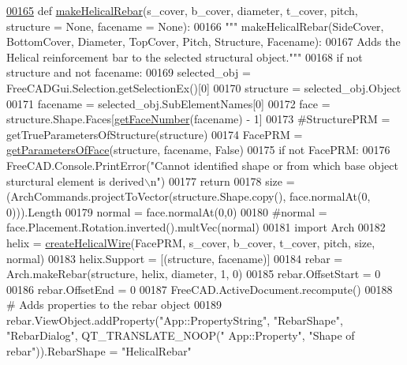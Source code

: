 \begin{DoxyCode}
\hypertarget{namespaceHelicalRebar.tex_l00165}{}\hyperlink{namespaceHelicalRebar_a8a4f12ed70819996ac31877957dfab08}{00165} \textcolor{keyword}{def }\hyperlink{namespaceHelicalRebar_a8a4f12ed70819996ac31877957dfab08}{makeHelicalRebar}(s\_cover, b\_cover, diameter, t\_cover, pitch, structure = None, facename
       = None):
00166     \textcolor{stringliteral}{""" makeHelicalRebar(SideCover, BottomCover, Diameter, TopCover, Pitch, Structure, Facename):}
00167 \textcolor{stringliteral}{    Adds the Helical reinforcement bar to the selected structural object."""}
00168     \textcolor{keywordflow}{if} \textcolor{keywordflow}{not} structure \textcolor{keywordflow}{and} \textcolor{keywordflow}{not} facename:
00169         selected\_obj = FreeCADGui.Selection.getSelectionEx()[0]
00170         structure = selected\_obj.Object
00171         facename = selected\_obj.SubElementNames[0]
00172     face = structure.Shape.Faces[\hyperlink{namespaceRebarfunc_a3885b3b63e3a41508ac79bc7550cf301}{getFaceNumber}(facename) - 1]
00173     \textcolor{comment}{#StructurePRM = getTrueParametersOfStructure(structure)}
00174     FacePRM = \hyperlink{namespaceRebarfunc_a92122b3d7cedd3d47bb63380a5ac4d08}{getParametersOfFace}(structure, facename, \textcolor{keyword}{False})
00175     \textcolor{keywordflow}{if} \textcolor{keywordflow}{not} FacePRM:
00176         FreeCAD.Console.PrintError(\textcolor{stringliteral}{"Cannot identified shape or from which base object sturctural element is
       derived\(\backslash\)n"})
00177         \textcolor{keywordflow}{return}
00178     size = (ArchCommands.projectToVector(structure.Shape.copy(), face.normalAt(0, 0))).Length
00179     normal = face.normalAt(0,0)
00180     \textcolor{comment}{#normal = face.Placement.Rotation.inverted().multVec(normal)}
00181     \textcolor{keyword}{import} Arch
00182     helix = \hyperlink{namespaceHelicalRebar_a1a2b3ce39b904ab0c3892ed0965d2844}{createHelicalWire}(FacePRM, s\_cover, b\_cover, t\_cover, pitch, size, normal)
00183     helix.Support = [(structure, facename)]
00184     rebar = Arch.makeRebar(structure, helix, diameter, 1, 0)
00185     rebar.OffsetStart = 0
00186     rebar.OffsetEnd = 0
00187     FreeCAD.ActiveDocument.recompute()
00188     \textcolor{comment}{# Adds properties to the rebar object}
00189     rebar.ViewObject.addProperty(\textcolor{stringliteral}{"App::PropertyString"}, \textcolor{stringliteral}{"RebarShape"}, \textcolor{stringliteral}{"RebarDialog"}, QT\_TRANSLATE\_NOOP(\textcolor{stringliteral}{"
      App::Property"}, \textcolor{stringliteral}{"Shape of rebar"})).RebarShape = \textcolor{stringliteral}{"HelicalRebar"}

\end{DoxyCode}
